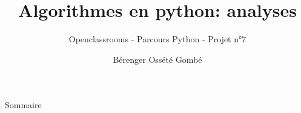 \documentclass{beamer}
\title{Algorithmes en python: analyses}
\subtitle{Openclassrooms - Parcours Python - Projet n°7}
\author{Bérenger Ossété Gombé}
\begin{document}
\begin{frame}
  \titlepage
\end{frame}

\begin{frame}{Sommaire}
  \tableofcontents
\end{frame}
\end{document}
